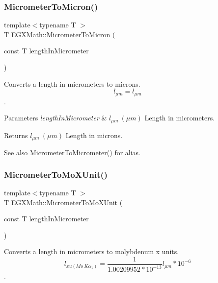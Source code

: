 \subsubsection{\texorpdfstring{Micrometer\+To\+Micron()}{MicrometerToMicron()}}
{\footnotesize\ttfamily template$<$typename T $>$ \\
T E\+G\+X\+Math\+::\+Micrometer\+To\+Micron (\begin{DoxyParamCaption}\item[{const T}]{length\+In\+Micrometer }\end{DoxyParamCaption})}



Converts a length in micrometers to microns. \[ l_{\mu m}=l_{\mu m} \]. 


\begin{DoxyParams}{Parameters}
{\em length\+In\+Micrometer} & $ l_{\mu m}\ (\mu m)$ Length in micrometers. \\
\hline
\end{DoxyParams}
\begin{DoxyReturn}{Returns}
$ l_{\mu m}\ (\mu m)$ Length in microns. 
\end{DoxyReturn}
\begin{DoxySeeAlso}{See also}
Micrometer\+To\+Micrometer() for alias. 
\end{DoxySeeAlso}
\mbox{\label{group___e_g_x_math-_conversions-_length_conversions-_micrometer-_non-_s_i_ga2ed475ce56e23d7783d6925f5b409f44}} 
\subsubsection{\texorpdfstring{Micrometer\+To\+Mo\+X\+Unit()}{MicrometerToMoXUnit()}}
{\footnotesize\ttfamily template$<$typename T $>$ \\
T E\+G\+X\+Math\+::\+Micrometer\+To\+Mo\+X\+Unit (\begin{DoxyParamCaption}\item[{const T}]{length\+In\+Micrometer }\end{DoxyParamCaption})}



Converts a length in micrometers to molybdenum x units. \[ l_{xu(Mo\ K\alpha_1)}=\frac{1}{1.00209952*10^{-13}} l_{\mu m} * 10^{-6}\]. 



